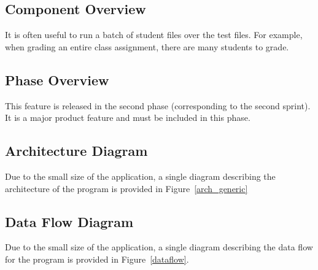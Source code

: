 \subsection{Component  Overview}
It is often useful to run a batch of student files over the test files. For example, when grading an entire class assignment, there are many students to grade. 

\subsection{Phase Overview}
This feature is released in the second phase (corresponding to the second sprint). It is a major product feature and must be included in this phase.

\subsection{Architecture Diagram}
Due to the small size of the application, a single diagram describing the architecture of the program is provided in Figure~\ref{arch_generic}


\subsection{Data Flow Diagram}
Due to the small size of the application, a single diagram describing the data flow for the program is provided in Figure~\ref{dataflow}.

